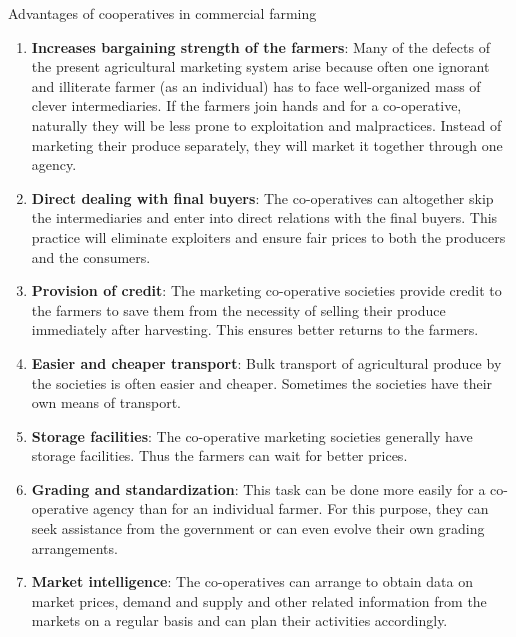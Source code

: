 \documentclass[12pt,ignorenonframetext,aspectratio=169]{beamer}
\providecommand{\tightlist}{%
  \setlength{\itemsep}{0pt}\setlength{\parskip}{0pt}}
\begin{document}
\begin{frame}{Advantages of cooperatives in commercial farming}
\protect\hypertarget{advantages-of-cooperatives-in-commercial-farming}{}
\footnotesize

\begin{enumerate}
\item
  \textbf{Increases bargaining strength of the farmers}: Many of the
  defects of the present agricultural marketing system arise because
  often one ignorant and illiterate farmer (as an individual) has to
  face well-organized mass of clever intermediaries. If the farmers join
  hands and for a co-operative, naturally they will be less prone to
  exploitation and malpractices. Instead of marketing their produce
  separately, they will market it together through one agency.
\item
  \textbf{Direct dealing with final buyers}: The co-operatives can
  altogether skip the intermediaries and enter into direct relations
  with the final buyers. This practice will eliminate exploiters and
  ensure fair prices to both the producers and the consumers.
\item
  \textbf{Provision of credit}: The marketing co-operative societies
  provide credit to the farmers to save them from the necessity of
  selling their produce immediately after harvesting. This ensures
  better returns to the farmers.
\end{enumerate}
\end{frame}

\begin{frame}{}
\protect\hypertarget{section-2}{}
\footnotesize

\begin{enumerate}
\setcounter{enumi}{3}
\tightlist
\item
  \textbf{Easier and cheaper transport}: Bulk transport of agricultural
  produce by the societies is often easier and cheaper. Sometimes the
  societies have their own means of transport.
\item
  \textbf{Storage facilities}: The co-operative marketing societies
  generally have storage facilities. Thus the farmers can wait for
  better prices.
\item
  \textbf{Grading and standardization}: This task can be done more
  easily for a co-operative agency than for an individual farmer. For
  this purpose, they can seek assistance from the government or can even
  evolve their own grading arrangements.
\item
  \textbf{Market intelligence}: The co-operatives can arrange to obtain
  data on market prices, demand and supply and other related information
  from the markets on a regular basis and can plan their activities
  accordingly.
\end{enumerate}
\end{frame}
\end{document}
